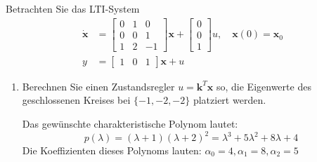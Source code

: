 \documentclass[crop=false]{standalone}
\begin{document}
\begin{task}
Betrachten Sie das LTI-System
\[
\begin{aligned} \dot{\mathbf{x}} &=\left[\begin{array}{ccc}{0} & {1} & {0} \\ {0} & {0} & {1} \\ {1} & {2} & {-1}\end{array}\right] \mathbf{x}+\left[\begin{array}{l}{0} \\ {0} \\ {1}\end{array}\right] u, \quad \mathbf{x}(0)=\mathbf{x}_{0} \\ y &=\left[\begin{array}{lll}{1} & {0} & {1}\end{array}\right] \mathbf{x}+u \end{aligned}
\]
\begin{enumerate}[i]
    \item Berechnen Sie einen Zustandsregler $u=\mathbf{k}^{T} \mathbf{x}$ so, die Eigenwerte des geschlossenen Kreises bei $\{-1,-2,-2\}$ platziert werden.
\begin{solution}
Das gewünschte charakteristische Polynom lautet:
\[ p(\lambda) = (\lambda +1) (\lambda +2)^2 = \lambda^3 + 5 \lambda^2 + 8 \lambda + 4 \]
Die Koeffizienten dieses Polynoms lauten: $\alpha_0 = 4, \alpha_1=8, \alpha_2 = 5$


\end{solution}
\end{enumerate}
\end{task}
\end{document}
